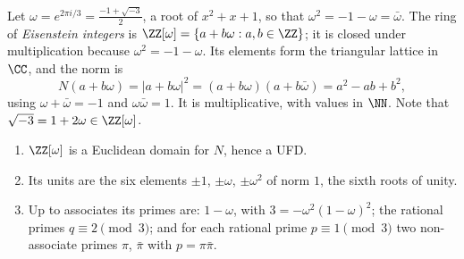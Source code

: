 Let $\omega = e^{2\pi i/3} = \frac{-1 + \sqrt{-3}}{2}$, a root of $x^2 + x + 1$, so that $\omega^2 = -1 - \omega = \bar\omega$. The ring of \emph{Eisenstein integers} is
$\ZZ[\omega] = \{a + b\omega : a, b \in \ZZ\}$; it is closed under multiplication because $\omega^2 = -1 - \omega$. Its elements form the triangular lattice in $\CC$, and the norm is
\[
N(a + b\omega) = |a + b\omega|^2 = (a + b\omega)(a + b\bar\omega) = a^2 - ab + b^2,
\]
using $\omega + \bar\omega = -1$ and $\omega\bar\omega = 1$. It is multiplicative, with values in $\NN$. Note that $\sqrt{-3} = 1 + 2\omega \in \ZZ[\omega]$.

\begin{proposition}\label{number-theory:proposition-eisenstein}
\begin{enumerate}
\item $\ZZ[\omega]$ is a Euclidean domain for $N$, hence a UFD.
\item Its units are the six elements $\pm1$, $\pm\omega$, $\pm\omega^2$ of norm $1$, the sixth roots of unity.
\item Up to associates its primes are: $1 - \omega$, with $3 = -\omega^2(1 - \omega)^2$; the rational primes $q \equiv 2 \pmod 3$; and for each rational prime $p \equiv 1 \pmod 3$ two non-associate primes
$\pi$, $\bar\pi$ with $p = \pi\bar\pi$.
\end{enumerate}
\end{proposition}

